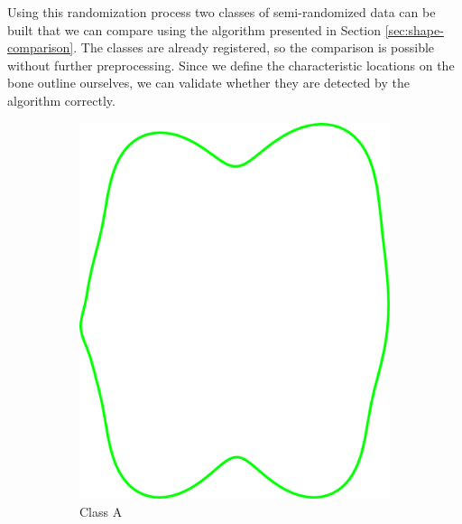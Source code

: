 \documentclass[pdftex,12pt,a4paper]{report}
\begin{document}
Using this randomization process two classes of semi-randomized data can be built that we can compare using the algorithm presented in Section \ref{sec:shape-comparison}. The classes are already registered, so the comparison is possible without further preprocessing. Since we define the characteristic locations on the bone outline ourselves, we can validate whether they are detected by the algorithm correctly.

\begin{figure}[h]
	\centering
	\begin{subfigure}[b]{0.24\textwidth}
		\centering
		\includegraphics[width=.9\linewidth]{img/synthetic-generation/classes/1-1.pdf}
		\caption{Class A}
		\label{subfig:synthetic-classes:a-1}
	\end{subfigure}
	\begin{subfigure}[b]{0.24\textwidth}
		\centering

\end{subfigure}
\end{figure}
\end{document}
